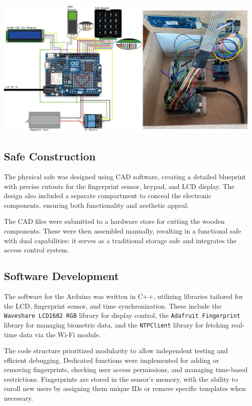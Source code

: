 \documentclass{article}
\begin{document}
    \begin{center}
         \includegraphics[width=1\linewidth]{images/Circuit-Box.png} 
         \captionsetup{hypcap=false}
         \captionsetup{hypcap=true} 
    \end{center}


    

\subsection{Safe Construction}
The physical safe was designed using CAD software, creating a detailed blueprint with precise cutouts for the fingerprint sensor, keypad, and LCD display. The design also included a separate compartment to conceal the electronic components, ensuring both functionality and aesthetic appeal.

The CAD files were submitted to a hardware store for cutting the wooden components. These were then assembled manually, resulting in a functional safe with dual capabilities: it serves as a traditional storage safe and integrates the access control system.

\subsection{Software Development}
The software for the Arduino was written in C++, utilizing libraries tailored for the LCD, fingerprint sensor, and time synchronization. These include the \texttt{Waveshare LCD1602 RGB} library for display control, the \texttt{Adafruit Fingerprint} library for managing biometric data, and the \texttt{NTPClient} library for fetching real-time data via the Wi-Fi module.

The code structure prioritized modularity to allow independent testing and efficient debugging. Dedicated functions were implemented for adding or removing fingerprints, checking user access permissions, and managing time-based restrictions. Fingerprints are stored in the sensor's memory, with the ability to enroll new users by assigning them unique IDs or remove specific templates when necessary.
\end{document}
